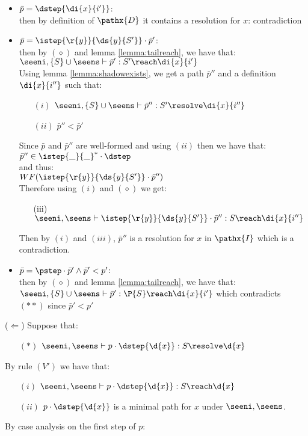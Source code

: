 \begin{itemize}[leftmargin=10mm]
 \item $\bar{p} = \dstep{\di{x}{i'}}$:\\
  then by definition of $\pathx{D}$ it contains a resolution for $x$: contradiction
 \item $\bar{p} = \istep{\r{y}}{\ds{y}{S'}}\cdot \bar{p}'$:\\
  then by $(\diamond)$ and lemma \ref{lemma:tailreach}, we have that:\\
  \tab $\seeni,\{S\} \cup \seens \vdash \bar{p}' : S' \reach \di{x}{i'}$\\
  Using lemma \ref{lemma:shadowexists}, we get a path $\bar{p}''$ and a definition $\di{x}{i''}$ such that:
  \begin{itemize}[leftmargin=15mm]
   \item[$(i)$] $ \seeni,\{S\} \cup \seens \vdash \bar{p}'' : S' \resolve \di{x}{i''}$
   \item[$(ii)$] $\bar{p}'' < \bar{p}'$
  \end{itemize}
  Since $\bar{p}$ and $\bar{p}''$ are well-formed and using $(ii)$ then we have that:\\
  \tab $\bar{p}'' \in \istep{\_}{\_}^*\cdot \dstep$\\
  and thus:\\
  \tab $WF(\istep{\r{y}}{\ds{y}{S'}}\cdot \bar{p}'')$\\
  Therefore using $(i)$ and $(\diamond)$ we get:
  \begin{itemize}[leftmargin=15mm]
   \item[(iii)] $\seeni,\seens \vdash \istep{\r{y}}{\ds{y}{S'}}\cdot \bar{p}'' : S \reach \di{x}{i''}$
  \end{itemize}
  Then by $(i)$ and $(iii)$, $\bar{p}''$ is a resolution for $x$ in $\pathx{I}$ which is a contradiction.
 \item $\bar{p} = \pstep \cdot \bar{p}' \wedge \bar{p}' < p'$:\\
 then by $(\diamond)$ and lemma \ref{lemma:tailreach}, we have that:\\
 \tab $\seeni,\{S\} \cup \seens \vdash \bar{p}' : \P{S} \reach \di{x}{i'}$ 
 which contradicts $(**)$ since $\bar{p}' < p'$ 
  \bigskip
\end{itemize}

\noindent ($\Leftarrow$) Suppose that:
\begin{itemize}[leftmargin=15mm]
 \item[$(*)$] $\seeni,\seens \vdash p \cdot \dstep{\d{x}}: S \resolve \d{x}$
\end{itemize}
By rule $(V')$ we have that:
\begin{itemize}[leftmargin=15mm]
 \item[$(i)$] $\seeni,\seens \vdash p \cdot \dstep{\d{x}} : S \reach \d{x}$
 \item[$(ii)$] $p\cdot \dstep{\d{x}}$ is a minimal path for $x$ under $\seeni,\seens$.
\end{itemize}
By case analysis on the first step of $p$: \medskip

